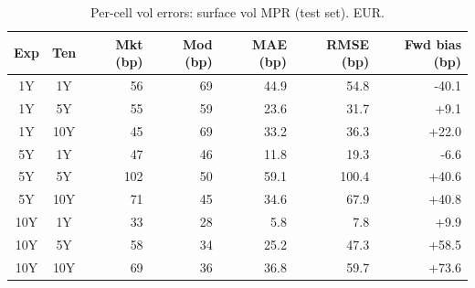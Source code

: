 \begin{table}[H]
\centering
\caption{Per-cell vol errors: surface vol MPR (test set). EUR.}
\label{tab:surface_vol_mpr_per_cell_test}
\small
\begin{tabular}{@{}ccrrrrr@{}}
\toprule
\textbf{Exp} & \textbf{Ten} & \textbf{Mkt (bp)} & \textbf{Mod (bp)} & \textbf{MAE (bp)} & \textbf{RMSE (bp)} & \textbf{Fwd bias (bp)} \\
\midrule
  1Y & 1Y & 56 & 69 & 44.9 & 54.8 & -40.1 \\
  1Y & 5Y & 55 & 59 & 23.6 & 31.7 & +9.1 \\
  1Y & 10Y & 45 & 69 & 33.2 & 36.3 & +22.0 \\
  \midrule
  5Y & 1Y & 47 & 46 & 11.8 & 19.3 & -6.6 \\
  5Y & 5Y & 102 & 50 & 59.1 & 100.4 & +40.6 \\
  5Y & 10Y & 71 & 45 & 34.6 & 67.9 & +40.8 \\
  \midrule
  10Y & 1Y & 33 & 28 & 5.8 & 7.8 & +9.9 \\
  10Y & 5Y & 58 & 34 & 25.2 & 47.3 & +58.5 \\
  10Y & 10Y & 69 & 36 & 36.8 & 59.7 & +73.6 \\
\bottomrule
\end{tabular}
\end{table}